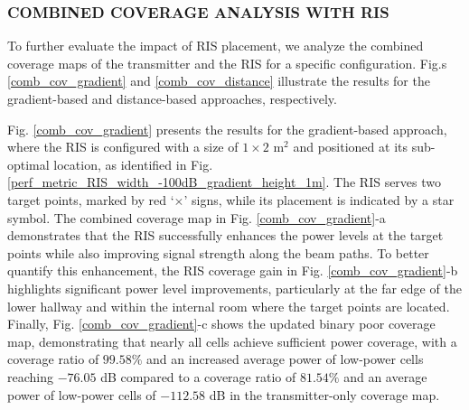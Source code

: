 \documentclass{IEEEoj}
\begin{document}
\subsubsection{COMBINED COVERAGE ANALYSIS WITH RIS}
To further evaluate the impact of RIS placement, we analyze the combined coverage maps of the transmitter and the RIS for a specific configuration. Fig.s \ref{comb_cov_gradient} and \ref{comb_cov_distance} illustrate the results for the gradient-based and distance-based approaches, respectively.

Fig. \ref{comb_cov_gradient} presents the results for the gradient-based approach, where the RIS is configured with a size of $1 \times 2$ m$^2$ and positioned at its sub-optimal location, as identified in Fig. \ref{perf_metric_RIS_width_-100dB_gradient_height_1m}. The RIS serves two target points, marked by red `$\times$' signs, while its placement is indicated by a star symbol. The combined coverage map in Fig. \ref{comb_cov_gradient}-a demonstrates that the RIS successfully enhances the power levels at the target points while also improving signal strength along the beam paths. To better quantify this enhancement, the RIS coverage gain in Fig. \ref{comb_cov_gradient}-b highlights significant power level improvements, particularly at the far edge of the lower hallway and within the internal room where the target points are located. Finally, Fig. \ref{comb_cov_gradient}-c shows the updated binary poor coverage map, demonstrating that nearly all cells achieve sufficient power coverage, with a coverage ratio of $99.58\%$ and an increased average power of low-power cells reaching $-76.05$ dB compared to a coverage ratio of $81.54\%$ and an average power of low-power cells of $-112.58$ dB in the transmitter-only coverage map.
\end{document}
